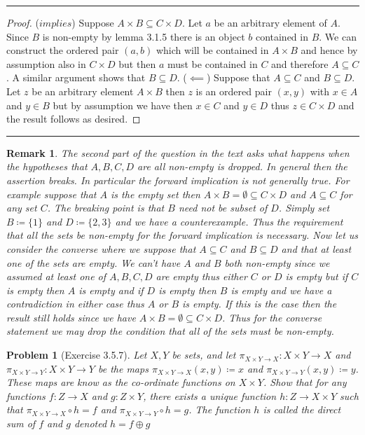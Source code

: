 \documentclass{article}
\newcommand{\lined}{\noindent\rule{\textwidth}{1pt}}
\newtheorem*{problem}{Problem}
\newtheorem*{remark}{Remark}
\begin{document}
	\lined
	\begin{proof}
		($implies$) Suppose $A \times B \subseteq C \times D$. Let $a$ be an arbitrary element of $A$. Since $B$ is non-empty by lemma 3.1.5 there is an object $b$ contained in $B$. We can construct the ordered pair $(a,b)$ which will be contained in 
		$A \times B$ and hence by assumption also in $C \times D$ but then $a$ must be contained in $C$ and therefore $A \subseteq C$. A similar argument shows that $B \subseteq D$. ($\impliedby$) Suppose that $A \subseteq C$ and $B \subseteq
		D$. Let $z$ be an arbitrary element $A \times B$ then $z$ is an ordered pair $(x,y)$ with $x \in A$ and $y \in B$ but by assumption we have then $x \in C$ and $y \in D$ thus $z \in C \times D$ and the result follows as desired.
	\end{proof}
	\lined
	
	\begin{remark}
		The second part of the question in the text asks what happens when the hypotheses that $A,B,C,D$ are all non-empty is dropped. In general then the assertion breaks. In particular the forward implication is not generally true. For example suppose that $A$ is the empty set then $A \times B = \emptyset \subseteq C \times D$ and $A \subseteq C$ for any set $C$. The breaking point is that $B$ need not be subset of $D$. Simply set $B \coloneqq \{1\}$ and $D \coloneqq \{2,3\}$ and we have a counterexample. Thus the requirement that all the sets be non-empty for the forward implication is necessary. Now let us consider the converse where we suppose that $A \subseteq C$ and $B \subseteq D$ and that at least one of the sets are empty.  We can't have $A$ and $B$ both non-empty since we assumed at least one of $A,B,C,D$ are empty thus either $C$ or $D$ is empty but if $C$ is empty then $A$ is empty and if $D$ is empty then $B$ is empty and we have a contradiction in either case thus $A$ or $B$ is empty. If this is the case then the result still holds since we have $A \times B = \emptyset \subseteq C \times D$. Thus for the converse statement we may drop the condition that all of the sets must be non-empty. 
	\end{remark}

	\newpage
	
	\begin{problem}[Exercise 3.5.7]
		Let $X,Y$ be sets, and let $\pi_{X \times Y \rightarrow X}:X \times Y \rightarrow X$ and $\pi_{X \times Y \rightarrow Y}:X \times Y \rightarrow Y$ be the maps $\pi_{X \times Y \rightarrow X}(x,y) \coloneqq x$ and $\pi_{X \times Y \rightarrow Y}(x,y) \coloneqq y$. These maps are know as the co-ordinate functions on $X \times Y$. Show that for any functions $f:Z \rightarrow X$ and $g:Z \times Y$, there exists a unique function $h:Z \rightarrow X \times Y$ such that  $\pi_{X \times Y \rightarrow X} \circ h = f$ and  $\pi_{X \times Y \rightarrow Y} \circ h = g$. The function $h$ is called the direct sum of $f$ and $g$ denoted $h = f \oplus g$
	\end{problem}
	
\end{document}
